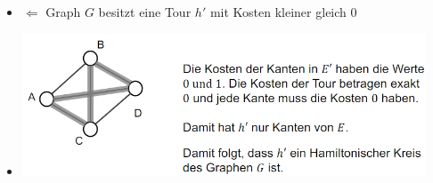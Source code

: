 \documentclass[
    12pt,
    a4paper,
    ngerman,
    color=3b,%
    marginpar=false,
    colorback=false,
    leqno,
]{tudaexercise}
\begin{document}
\begin{itemize}
\begin{itemize}
\begin{itemize}
                        \item $\Leftarrow$ Graph $G$ besitzt eine Tour $h'$ mit Kosten kleiner gleich 0
                        \item[] \includegraphics[width=12cm]{pictures/schwer2.PNG}
                    \end{itemize}
          \end{itemize}

\end{itemize}
\end{document}

